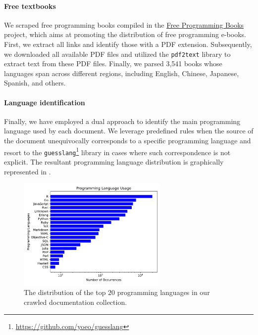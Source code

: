\documentclass[10pt]{article} %
\begin{document}
\paragraph{Free textbooks} We scraped free programming books compiled in the \href{https://github.com/EbookFoundation/free-programming-books}{Free Programming Books} project, which aims at promoting the distribution of free programming e-books. First, we extract all links and identify those with a PDF extension. Subsequently, we downloaded all available PDF files and utilized the \verb|pdf2text| library to extract text from these PDF files. Finally, we parsed 3,541 books whose languages span across different regions, including English, Chinese, Japanese, Spanish, and others.


\paragraph{Language identification} Finally, we have employed a dual approach to identify the main programming language used by each document. We leverage predefined rules when the source of the document unequivocally corresponds to a specific programming language and resort to the \verb|guesslang|\footnote{\url{https://github.com/yoeo/guesslang}} library in cases where such correspondence is not explicit. The resultant programming language distribution is graphically represented in .

\begin{figure}
    \centering
    \includegraphics[width=0.65\textwidth]{figures/doc_lang_distribution.pdf}
    \caption{The distribution of the top $20$ programming languages in our crawled documentation collection.}
    \label{fig:doc_lang_distribution}
\end{figure}
\end{document}
